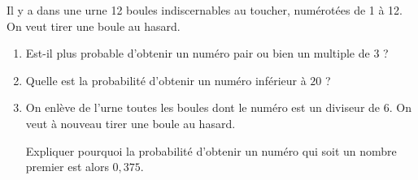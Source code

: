 
Il y a dans une urne 12 boules indiscernables au toucher, numérotées de 1 à 12. On veut
tirer une boule au hasard.

\medskip

\begin{enumerate}
\item Est-il plus probable d'obtenir un numéro pair ou bien un multiple de $3$ ?
\item Quelle est la probabilité d'obtenir un numéro inférieur à $20$ ?
\item On enlève de l'urne toutes les boules dont le numéro est un diviseur de $6$. On veut à
nouveau tirer une boule au hasard.

Expliquer pourquoi la probabilité d'obtenir un numéro qui soit un nombre premier
est alors $0,375$.
\end{enumerate}
